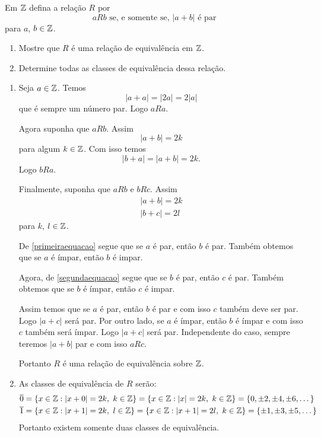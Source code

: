 \documentclass[12pt]{exam}
\begin{document}
    \questao{} Em $\mathbb{Z}$ defina a relação $R$ por
    \[
    a R b \mbox{ se, e somente se, } |a + b| \mbox{ é par}
    \]
    para $a$, $b \in \mathbb{Z}$.
    \begin{enumerate}[label={\alph*})]
        \item Mostre que $R$ é uma relação de equivalência em $\mathbb{Z}$.

        \item Determine todas as classes de equivalência dessa relação.
    \end{enumerate}
    \solucao
    \begin{enumerate}[label={\alph*})]
        \item Seja $a \in \mathbb{Z}$. Temos
        \[
            |a + a| = |2a| = 2|a|
        \]
        que é sempre um número par. Logo $aRa$.

        Agora suponha que $aRb$. Assim
        \[
            |a + b| = 2k
        \]
        para algum $k \in \mathbb{Z}$. Com isso temos
        \[
            |b + a| = |a + b| = 2k.
        \]
        Logo $bRa$.

        Finalmente, suponha que $aRb$ e $bRc$. Assim
        \begin{align}
            |a + b| = 2k\label{primeiraequacao}\\
            |b + c| = 2l\label{segundaequacao}
        \end{align}
        para $k$, $l \in \mathbb{Z}$.

        De \eqref{primeiraequacao} segue que se $a$ é par, então $b$ é par. Também obtemos que se $a$ é ímpar, então $b$ é impar.

        Agora, de \eqref{segundaequacao} segue que se $b$ é par, então $c$ é par. Também obtemos que se $b$ é ímpar, então $c$ é impar.

        Assim temos que se $a$ é par, então $b$ é par e com isso $c$ também deve ser par. Logo $|a + c|$ será par. Por outro lado, se $a$ é ímpar, então $b$ é ímpar e com isso $c$ também será ímpar. Logo $|a + c|$ será par. Independente do caso, sempre teremos $|a + b|$ par e com isso $aRc$.

        Portanto $R$ é uma relação de equivalência sobre $\mathbb{Z}$.

        \item As classes de equivalência de $R$ serão:
        \begin{align*}
            \overline{0} &= \{x \in \mathbb{Z} : |x + 0| = 2k,\ k \in \mathbb{Z}\} = \{x \in \mathbb{Z} : |x| = 2k, \ k \in \mathbb{Z}\} = \{0, \pm 2, \pm 4, \pm 6, \dots\}\\
            \overline{1} &= \{x \in \mathbb{Z} : |x + 1| = 2k,\ l \in \mathbb{Z}\} = \{x \in \mathbb{Z} : |x + 1| = 2l, \ k \in \mathbb{Z}\} = \{\pm 1, \pm 3, \pm 5, \dots\}
        \end{align*}
        Portanto existem somente duas classes de equivalência.
    \end{enumerate}
    \vspace*{.75cm}
\end{document}
